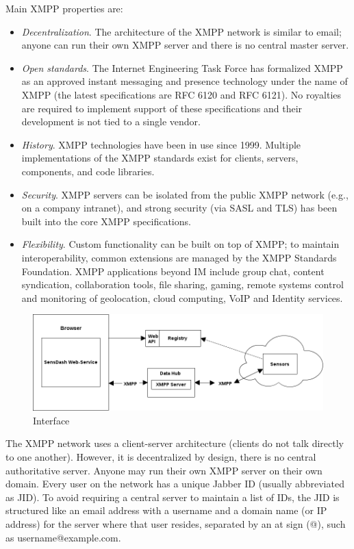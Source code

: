       Main XMPP properties are:
    \begin{itemize}
      \item \emph{Decentralization}. The architecture of the XMPP network is similar to email; anyone can run their own XMPP server and there is no central master server.
     \item \emph{Open standards}. The Internet Engineering Task Force has formalized XMPP as an approved instant messaging and presence technology under the name of XMPP (the latest specifications are RFC 6120 and RFC 6121). No royalties are required to implement support of these specifications and their development is not tied to a single vendor.
      \item \emph{History}. XMPP technologies have been in use since 1999. Multiple implementations of the XMPP standards exist for clients, servers, components, and code libraries.
      \item \emph{Security}. XMPP servers can be isolated from the public XMPP network (e.g., on a company intranet), and strong security (via SASL and TLS) has been built into the core XMPP specifications.
      \item \emph{Flexibility}. Custom functionality can be built on top of XMPP; to maintain interoperability, common extensions are managed by the XMPP Standards Foundation. XMPP applications beyond IM include group chat, content syndication, collaboration tools, file sharing, gaming, remote systems control and monitoring of geolocation, cloud computing, VoIP and Identity services.
      \end{itemize}

      \begin{figure}[!ht]
      \centering
      \includegraphics[scale=0.5]{images/Interface.png}   
      \caption[Interface]{Interface}
      \label{img:interfaces}                           
      \end{figure}

      The XMPP network uses a client-server architecture (clients do not talk directly to one another). However, it is decentralized by design, there is no central authoritative server. Anyone may run their own XMPP server on their own domain. Every user on the network has a unique Jabber ID (usually abbreviated as JID). To avoid requiring a central server to maintain a list of IDs, the JID is structured like an email address with a username and a domain name (or IP address) for the server where that user resides, separated by an at sign (@), such as username@example.com.  

